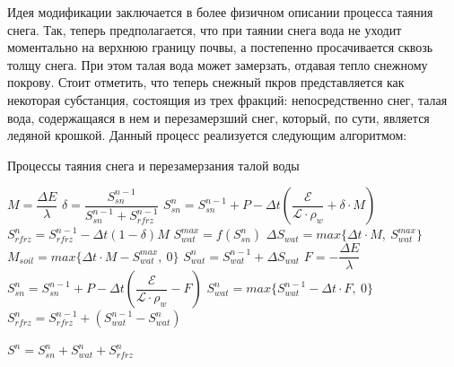 \documentclass[a4paper, fontsize=14pt]{scrartcl}
\begin{document}
Идея модификации заключается в более физичном описании процесса таяния снега. Так, теперь предполагается, что при таянии снега вода не уходит моментально на верхнюю границу почвы, а постепенно просачивается сквозь толщу снега. При этом талая вода может замерзать, отдавая тепло снежному покрову. Стоит отметить, что теперь снежный пкров представляется как некоторая субстанция, состоящия из трех фракций: непосредственно снег, талая вода, содержащаяся в нем и перезамерзший снег, который, по сути, является ледяной крошкой. Данный процесс реализуется следующим алгоритмом:

\begin{algorithm}[H]
\caption{Процессы таяния снега и перезамерзания талой воды}
\label{alg:setup}
\begin{algorithmic}[]
        \State $ M = \dfrac{\Delta E}{\lambda} $ 
        \State $ \delta = \dfrac{S_{sn}^{n-1}}{S_{sn}^{n-1} + S_{rfrz}^{n - 1}}$ 
        \State $ S_{sn}^n = S_{sn}^{n-1} + P - \Delta t \left( \dfrac{\mathcal{E}}{\mathcal{L} \cdot \rho_w} + \delta \cdot M \right) $ 
        \State $ S_{rfrz}^n = S_{rfrz}^{n - 1} - \Delta t (1 - \delta)M $ 
        \State $ S_{wat}^{max} = f( S_{sn}^n ) $
        \State $ \Delta S_{wat} = max\{\Delta t \cdot M, ~S_{wat}^{max}\} $ 
        \State $ M_{soil} = max\{\Delta t \cdot M - S_{wat}^{max}, ~0\} $ 
        \State $ S_{wat}^n = S_{wat}^{n-1} + \Delta S_{wat} $ 
    \Else
            \State $F = -\dfrac{\Delta E}{\lambda}$
            \State $S_{sn}^n = S_{sn}^{n-1} + P - \Delta t \left( \dfrac{\mathcal{E}}{\mathcal{L} \cdot \rho_w} - F \right)$
            \State $S_{wat}^n = max\{ S_{wat}^{n-1} - \Delta t \cdot F, ~0\}$
            \State $S_{rfrz}^n = S_{rfrz}^{n - 1} + ( S_{wat}^{n-1} - S_{wat}^n )$
            
        \EndIf
    \EndIf
    \State $S^n = S_{sn}^n + S_{wat}^n + S_{rfrz}^n$
\end{algorithmic}
\end{algorithm}
\end{document}
